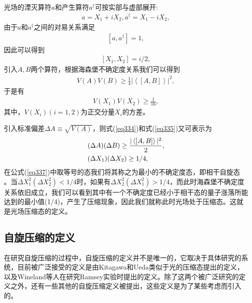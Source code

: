 光场的湮灭算符$a$和产生算符$a^\dagger$可按实部与虚部展开:
\begin{align}
	a = {X_1} + i{X_2},{a^\dag } = {X_1} - i{X_2},\label{eq331}
\end{align} 
由于$a$和$a^\dagger$之间的对易关系满足
\begin{align}
	\left[ {a,{a^\dag }} \right] = 1,\label{eq332}
\end{align}
因此可以得到
\begin{align}
	\left[ {{X_1},{X_2}} \right] = i/2,\label{eq333}
\end{align}
引入$A,B$两个算符，根据海森堡不确定度关系我们可以得到
\begin{align}\label{eq334}
	V\left( A \right)V\left( B \right) \ge \frac{1}{4}{\left| {\left\langle {\left[ {A,B} \right]} \right\rangle } \right|^2},
\end{align}
于是有
\begin{align}\label{eq335}
	V\left( {{X_1}} \right)V\left( {{X_2}} \right) \ge \frac{1}{{16}},
\end{align}
其中，$V\left( {{X_i}} \right)\left( {i = 1,2} \right)$为正交分量$X_i$的方差。

引入标准偏差$\Delta A \equiv \sqrt {V\left( A \right)} $，则式(\ref{eq334})和式(\ref{eq335})又可表示为
\begin{align}
	&( \Delta A)(\Delta B) \ge \frac{|\braket{[A,B]}|^2}2,\label{eq336}\\
	&( \Delta X_1)( \Delta X_2) \ge 1/4,\label{eq337}
\end{align}
在公式(\ref{eq337})中取等号的态我们将其称之为最小的不确定度态，即相干自旋态%
。当$\Delta X_1^2\left( {\Delta X_2^2} \right) < 1/4$时，如果有$\Delta X_2^2\left( {\Delta X_1^2} \right) >1/4$，而此时海森堡不确定度关系依旧成立，我们可以看到其中有一个不确定度已经小于相干态的量子涨落所能达到的最小值(1/4)，产生了压缩现象，因此我们就称此时光场处于压缩态。这就是光场压缩态的定义。

\subsection{自旋压缩的定义}

在研究自旋压缩的过程中，自旋压缩的定义并不是唯一的，它取决于具体研究的系统，目前被广泛接受的定义是由Kitagawa和Ueda类似于光的压缩态提出的定义\cite{PRA1993Kitagawa}，以及Wineland等人\cite{PRA1994Wineland}在研究Ramsey实验时提出的定义。除了这两个被广泛研究的定义之外，还有一些其他的自旋压缩定义\cite{sorensen2001many,toth2009spin,wang2010sudden}被提出，这些定义是为了某些考虑而引入的。

